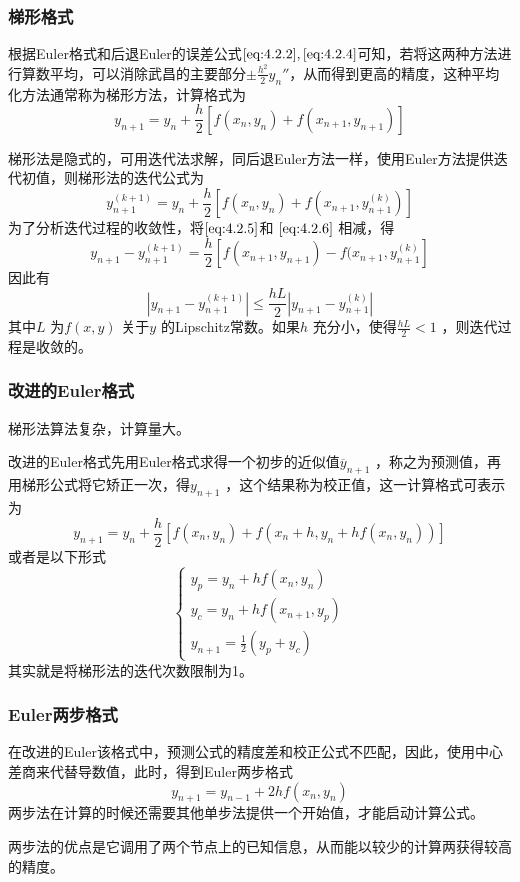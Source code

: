 \documentclass[a4paper]{article}
\begin{document}
\subsubsection{梯形格式}
根据Euler格式和后退Euler的误差公式$\ref{eq:4.2.2},\ref{eq:4.2.4}$可知，若将这两种方法进行算数平均，可以消除武昌的主要部分$\pm \frac{h^2}{2} y_{n}''$，从而得到更高的精度，这种平均化方法通常称为梯形方法，计算格式为
\[
	y_{n+1} = y_{n} + \frac{h}{2} [f(x_{n}, y_{n}) + f(x_{n+1}, y_{n+1})] \tag{4.2.5} \label{eq:4.2.5} 
\] 

梯形法是隐式的，可用迭代法求解，同后退Euler方法一样，使用Euler方法提供迭代初值，则梯形法的迭代公式为
\[
	y_{n+1}^{(k+1)} = y_{n} + \frac{h}{2} [f(x_{n},y_{n}) + f(x_{n+1},y_{n+1}^{(k)})] \tag{4.2.6} \label{eq:4.2.6} 
\] 
为了分析迭代过程的收敛性，将$\ref{eq:4.2.5}$和 $\ref{eq:4.2.6}$ 相减，得
\[
	y_{n+1} - y_{n+1}^{(k+1)} = \frac{h}{2} [f(x_{n+1}, y_{n+1}) - f(x_{n+1}, y_{n+1}^{(k)}]
\] 
因此有
\[
| y_{n+1} - y_{n+1}^{(k+1)} | \le \frac{hL}{2} |y_{n+1} - y_{n+1}^{(k)}|
\] 
其中$L$ 为$f(x,y)$ 关于$y$ 的Lipschitz常数。如果$h$ 充分小，使得$\frac{hL}{2} < 1$ ，则迭代过程是收敛的。

\subsubsection{改进的Euler格式}
梯形法算法复杂，计算量大。

改进的Euler格式先用Euler格式求得一个初步的近似值$\overline{y}_{n+1}$ ，称之为预测值，再用梯形公式将它矫正一次，得$y_{n+1}$ ，这个结果称为校正值，这一计算格式可表示为
\[
	y_{n+1} = y_{n} + \frac{h}{2} [f(x_{n}, y_{n}) + f(x_{n} + h, y_{n} + hf(x_{n}, y_{n}))] \tag{4.2.7} \label{eq:4.2.7} 
\] 
或者是以下形式
\[
\begin{cases}
	y_p = y_{n} + h f(x_{n}, y_{n}) \\
	y_c = y_{n} + h f(x_{n+1}, y_p) \\
	y_{n+1} = \frac{1}{2} (y_p + y_c)
\end{cases} 
\] 
其实就是将梯形法的迭代次数限制为1。
\subsubsection{Euler两步格式}
在改进的Euler该格式中，预测公式的精度差和校正公式不匹配，因此，使用中心差商来代替导数值，此时，得到Euler两步格式
\[
y_{n+1} = y_{n-1} + 2h f(x_{n}, y_{n}) \tag{4.2.8} \label{eq:4.2.8} 
\] 
两步法在计算的时候还需要其他单步法提供一个开始值，才能启动计算公式。

两步法的优点是它调用了两个节点上的已知信息，从而能以较少的计算两获得较高的精度。
\end{document}
